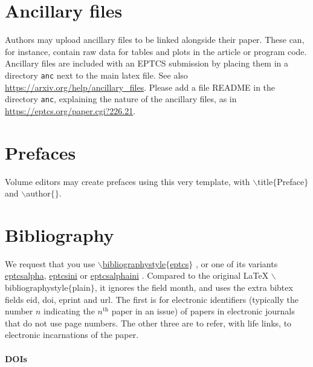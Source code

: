 \documentclass[submission,copyright,creativecommons]{eptcs}
\begin{document}
\section{Ancillary files}

Authors may upload ancillary files to be linked alongside their paper.
These can, for instance, contain raw data for tables and plots in the
article or program code.  Ancillary files are included with an EPTCS
submission by placing them in a directory \texttt{anc} next to the
main latex file. See also \url{https://arxiv.org/help/ancillary_files}.
Please add a file README in the directory \texttt{anc}, explaining the
nature of the ancillary files, as in
\url{https://eptcs.org/paper.cgi?226.21}.

\section{Prefaces}

Volume editors may create prefaces using this very template,
with {\ttfamily $\backslash$title$\{$Preface$\}$} and {\ttfamily $\backslash$author$\{\}$}.

\section{Bibliography}

We request that you use
\href{https://eptcs.web.cse.unsw.edu.au/eptcs.bst}
{\ttfamily $\backslash$bibliographystyle$\{$eptcs$\}$}
\cite{bibliographystylewebpage}, or one of its variants
\href{https://eptcs.web.cse.unsw.edu.au/eptcsalpha.bst}{eptcsalpha},
\href{https://eptcs.web.cse.unsw.edu.au/eptcsini.bst}{eptcsini} or
\href{https://eptcs.web.cse.unsw.edu.au/eptcsalphaini.bst}{eptcsalphaini}
\cite{bibliographystylewebpage}. Compared to the original {\LaTeX}
{\ttfamily $\backslash$biblio\-graphystyle$\{$plain$\}$},
it ignores the field {\ttfamily month}, and uses the extra
bibtex fields {\ttfamily eid}, {\ttfamily doi}, {\ttfamily eprint} and {\ttfamily url}.
The first is for electronic identifiers (typically the number $n$
indicating the $n^\mathrm{th}$ paper in an issue) of papers in electronic
journals that do not use page numbers. The other three are to refer,
with life links, to electronic incarnations of the paper.

\paragraph{DOIs}
\end{document}
